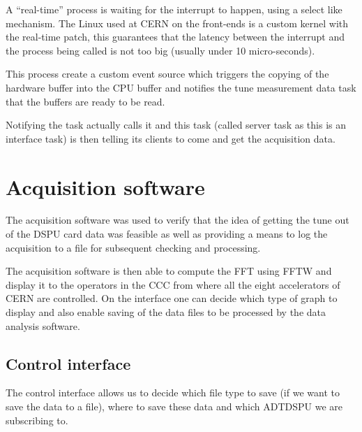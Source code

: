 A ``real-time'' process is waiting for the interrupt to happen, using a select like mechanism. The Linux used at \gls{CERN} on the front-ends is a custom kernel with the real-time patch, this guarantees that the latency between the interrupt and the process being called is not too big (usually under 10 micro-seconds).

This process create a custom event source which triggers the copying of the hardware buffer into the \gls{CPU} buffer and notifies the tune measurement data task that the buffers are ready to be read.

Notifying the task actually calls it and this task (called server task as this is an interface task) is then telling its clients to come and get the acquisition data. 

\section{Acquisition software}

The acquisition software was used to verify that the idea of getting the tune out of the DSPU card data was feasible as well as providing a means to log the acquisition to a file for subsequent checking and processing.

The acquisition software is then able to compute the \gls{FFT} using
\gls{FFTW} and display it to the operators in the \gls{CCC} from where
all the eight accelerators of \gls{CERN} are controlled. On the
interface one can decide which type of graph to display and also
enable saving of the data files to be processed by the data analysis
software.

\subsection{Control interface}

The control interface allows us to decide which file type to save (if we want to save the data to a file), where to save these data and which ADTDSPU we are subscribing to.

